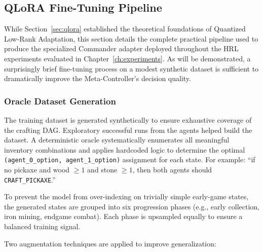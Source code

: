\subsection{QLoRA Fine-Tuning Pipeline}
\label{sec:qlora_pipeline}

While Section~\ref{sec:qlora} established the theoretical foundations of Quantized Low-Rank Adaptation, this section details the complete practical pipeline used to produce the specialized Commander adapter deployed throughout the HRL experiments evaluated in Chapter~\ref{ch:experiments}. As will be demonstrated, a surprisingly brief fine-tuning process on a modest synthetic dataset is sufficient to dramatically improve the Meta-Controller's decision quality.

\subsubsection{Oracle Dataset Generation}

The training dataset is generated synthetically to ensure exhaustive coverage of the crafting DAG. Exploratory successful runs from the agents helped build the dataset. A deterministic oracle systematically enumerates all meaningful inventory combinations and applies hardcoded logic to determine the optimal \texttt{(agent\_0\_option, agent\_1\_option)} assignment for each state. For example: ``if no pickaxe and wood $\ge 1$ and stone $\ge 1$, then both agents should \texttt{CRAFT\_PICKAXE}.''

To prevent the model from over-indexing on trivially simple early-game states, the generated states are grouped into six progression phases (e.g., early collection, iron mining, endgame combat). Each phase is upsampled equally to ensure a balanced training signal.

Two augmentation techniques are applied to improve generalization:

